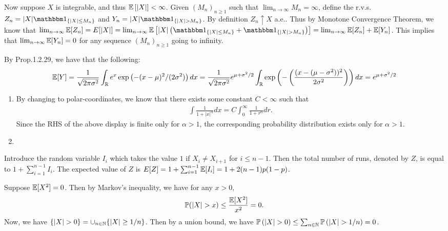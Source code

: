 Now suppose $X$ is integrable, and thus $\mathbb{E}\left [ |X| \right ] < \infty$. Given $(M_n)_{n \geq 1}$ such that $\lim_{n \to \infty}M_n=\infty$, define the r.v.s. $Z_n = |X| \indi{|X|\leq M_n}$ and $Y_n = |X|\indi{|X|>M_n}$. By definition $Z_n \uparrow X$ a.e.. Thus by Monotone Convergence Theorem, we know that $\lim_{n \to \infty} \mbb{E}[Z_n] = E[|X|] = \lim_{n \to \infty} \mbb{E}\lb |X| \lp \indi{|X|\leq M_n} + \indi{|X|>M_n}\rp \rb  = \lim_{n \to \infty}\mbb{E}[Z_n] + \mbb{E}[Y_n]$. This implies that $\lim_{n \to \infty} \mathbb{E}[Y_n]= 0$ for any sequence $(M_n)_{n \geq 1}$ going to infinity. 

 By Prop.1.2.29, we have that the following:
\begin{align*}
    \mathbb{E}[Y] = \frac{1}{\sqrt{2 \pi \sigma^2}} \int_{\mathbb{R}} e^{x}  \exp \left (-(x-\mu)^2/(2\sigma^2)\right ) dx 
    = \frac{1}{\sqrt{2 \pi \sigma^2}} e^{\mu+\sigma^2/2} \int_{\mathbb{R}} \exp\left ( - \left ( \frac{(x-(\mu-\sigma^2))^2}{2\sigma^2} \right ) \right ) dx = e^{\mu + \sigma^2/2}
\end{align*}


\begin{enumerate}[label=(\alph*)]
\item By changing to polar-coordinates, we know that there exists some constant $C<\infty$ such that 
\begin{align*}
    \int \frac{1}{1+|x|^\alpha}dx  = C \int_{0}^{\infty}\frac{1}{1+r^\alpha}dr. 
\end{align*}
Since the RHS of the above display is finite only for $\alpha>1$, the corresponding probability distribution exists only for $\alpha>1$. 

\item 
\end{enumerate}




Introduce the random variable $I_i$ which takes the value $1$ if $X_i \neq X_{i+1}$ for $i \leq n-1$. Then the total number of runs, denoted by $Z$, is equal to $1+ \sum_{i=1}^{n-1} I_i$. The expected value of $Z$ is $E[Z] = 1 + \sum_{i=1}^{n-1}\mathbb{E}[I_i] = 1 + 2(n-1)p(1-p)$. 

Suppose $\mathbb{E}[X^2]=0$. Then by Markov's inequality, we have for any $x>0$, 
\begin{align*}
   \mbb{P}(|X|>x) \leq \frac{\mbb{E}[X^2]}{x^2} = 0. 
\end{align*}
Now, we have $\{|X|>0\} = \cup_{n \in \mbb{N}}\{|X| \geq 1/n\}$. Then by a union bound, we have $\mathbb{P}\left ( |X| > 0 \right ) \leq \sum_{n\in \mathbb{N}} \mathbb{P} \left ( |X| > 1/n\right ) = 0$. 


